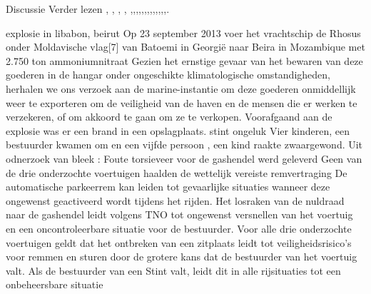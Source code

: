 \cite{Whitehead2017ukrainepoweroutage}
{Discussie}
{Verder lezen}
\cite{shahzad2014ScadaProtocolsPollingScenario},
\cite{grammatikis2019AttackIEC6087505104},
\cite{2017win32industroyer},
\cite{yadav2020reviewScadaArchitecture},
\cite{arrizabalaga2020surveyiiotProtocols},\cite{fauri2017EncryptionICS},\cite{resch31102019IEC62351secureCommunication},\cite{levalle2020FuzzingICSProtocols},\cite{blackhatusa2017},\cite{blackhatusa2017},\cite{abb30062017crashoverridenotification},\cite{spinner2018crashoverrideiot},\cite{njccicthreat08102017crashovverrideprofile},\cite{slowikvb2018crashoverride},\cite{crashoverridenetwork},\cite{wikiindustroyer},\cite{icsSecurityRussianHacking},\cite{holappa2017threattoElectricityNetworks}.

\newline \indent explosie in libabon, beirut 
Op 23 september 2013 voer het vrachtschip de Rhosus onder Moldavische vlag[7] van Batoemi in Georgië naar Beira in Mozambique met 2.750 ton ammoniumnitraat
Gezien het ernstige gevaar van het bewaren van deze goederen in de hangar onder ongeschikte klimatologische omstandigheden, herhalen we ons verzoek aan de marine-instantie om deze goederen onmiddellijk weer te exporteren om de veiligheid van de haven en de mensen die er werken te verzekeren, of om akkoord te gaan om ze te verkopen.
Voorafgaand aan de explosie was er een brand in een opslagplaats. 
\cite{hrw03082021investigateBeirutBlast}
\cite{souaibyElHussein112020Beirutstory}
\cite{ifrc2020chemicalexplosionBeirutPort}
\newline \indent  stint ongeluk
Vier kinderen, een bestuurder kwamen om en een vijfde persoon , een kind raakte zwaargewond. Uit odnerzoek van bleek :
Foute torsieveer voor de gashendel werd geleverd
Geen van de drie onderzochte voertuigen haalden de wettelijk vereiste remvertraging
De automatische parkeerrem kan leiden tot gevaarlijke situaties wanneer deze ongewenst geactiveerd wordt tijdens het rijden. 
Het losraken van de nuldraad naar de gashendel leidt volgens TNO tot ongewenst versnellen van het voertuig en een oncontroleerbare situatie voor de bestuurder.
Voor alle drie onderzochte voertuigen geldt dat het ontbreken van een zitplaats leidt tot veiligheidsrisico’s voor remmen en sturen door de grotere kans dat de bestuurder van het voertuig valt. Als de bestuurder van een Stint valt, leidt dit in alle rijsituaties tot een onbeheersbare situatie
